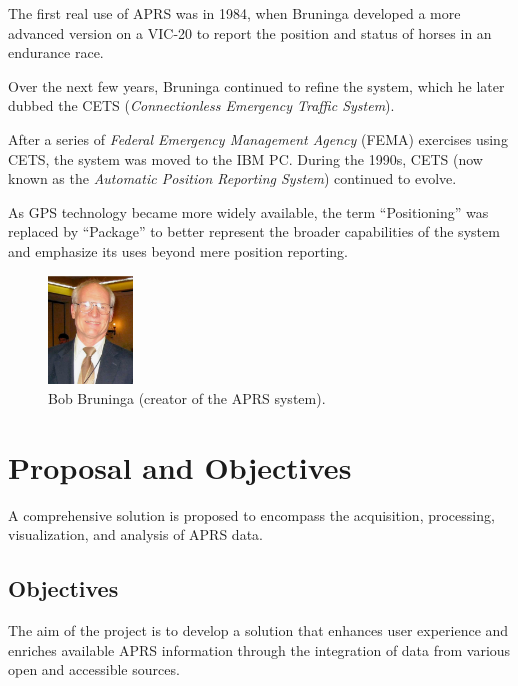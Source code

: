 The first real use of APRS was in 1984, when Bruninga developed a more advanced version on a VIC-20 to report the position and status of horses in an endurance race.

Over the next few years, Bruninga continued to refine the system, which he later dubbed the CETS (\textit{Connectionless Emergency Traffic System}).

After a series of \textit{Federal Emergency Management Agency} (FEMA) exercises using CETS, the system was moved to the IBM PC. During the 1990s, CETS (now known as the \textit{Automatic Position Reporting System}) continued to evolve.

As GPS technology became more widely available, the term ``Positioning'' was replaced by ``Package'' to better represent the broader capabilities of the system and emphasize its uses beyond mere position reporting.

\begin{figure}[h]
	\centering
	\includegraphics[width=0.2\textwidth]{Imagenes/Chapter_1/bob_bruninga.png}
	\caption{Bob Bruninga (creator of the APRS system).}
	\label{fig:bob-bruninga-en}
\end{figure}


\section{Proposal and Objectives}

A comprehensive solution is proposed to encompass the acquisition, processing, visualization, and analysis of APRS data.

\subsection{Objectives}

The aim of the project is to develop a solution that enhances user experience and enriches available APRS information through the integration of data from various open and accessible sources.

